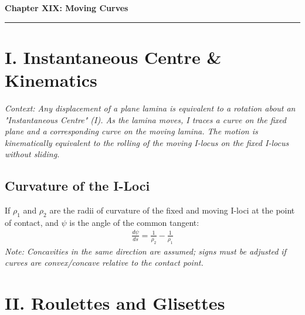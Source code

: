 \documentclass[11pt, a4paper]{article}
\begin{document}
\newpage

\begin{center}
    {\LARGE \bfseries \color{accent} Chapter XIX: Moving Curves}\\
    \vspace{0.2cm}
    {\color{accent}\rule{0.55\linewidth}{0.8pt}}
\end{center}
\vspace{0.35cm}

\begin{center}
\end{center}


\section*{\color{primary} I. Instantaneous Centre \& Kinematics}

\textit{\small Context: Any displacement of a plane lamina is equivalent to a rotation about an "Instantaneous Centre" (I). As the lamina moves, I traces a curve on the fixed plane and a corresponding curve on the moving lamina. The motion is kinematically equivalent to the rolling of the moving I-locus on the fixed I-locus without sliding.}

\subsection*{\color{secondary} Curvature of the I-Loci}
If $\rho_1$ and $\rho_2$ are the radii of curvature of the fixed and moving I-loci at the point of contact, and $\psi$ is the angle of the common tangent:
\begin{align*}
    \frac{d\psi}{ds} = \frac{1}{\rho_2} - \frac{1}{\rho_1}
\end{align*}
\textit{\small Note: Concavities in the same direction are assumed; signs must be adjusted if curves are convex/concave relative to the contact point.}


\section*{\color{primary} II. Roulettes and Glisettes}
\end{document}
